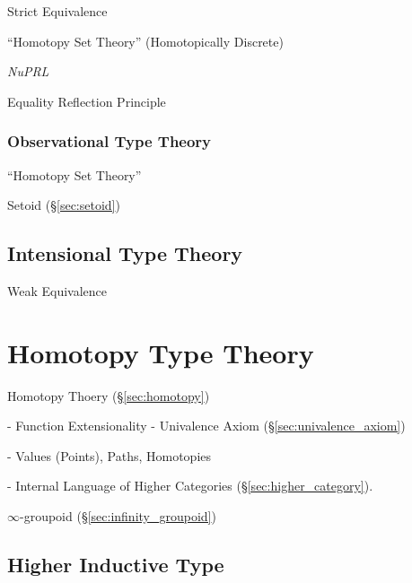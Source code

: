 Strict Equivalence

``Homotopy Set Theory'' (Homotopically Discrete)

\emph{NuPRL}

Equality Reflection Principle



\subsubsection{Observational Type Theory}\label{sec:observational_type}

``Homotopy Set Theory''

Setoid (\S\ref{sec:setoid})



\subsection{Intensional Type Theory}\label{sec:intensional_type}
\cite{harper12}

Weak Equivalence



\section{Homotopy Type Theory}\label{sec:homotopy_type}

Homotopy Thoery (\S\ref{sec:homotopy})

- Function Extensionality
- Univalence Axiom (\S\ref{sec:univalence_axiom})

- Values (Points), Paths, Homotopies

- Internal Language of Higher Categories
(\S\ref{sec:higher_category}).

$\infty$-groupoid (\S\ref{sec:infinity_groupoid})



\subsection{Higher Inductive Type}\label{sec:higher_inductive_type}



